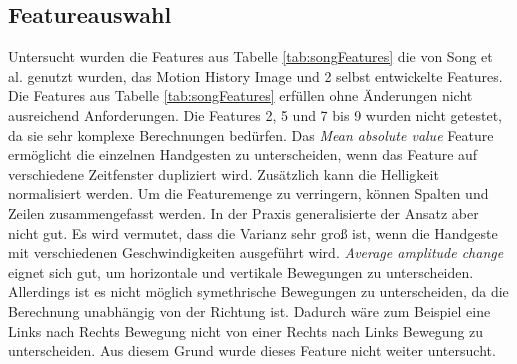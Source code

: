 \subsection{Featureauswahl}
\label{sec:feature_selection}
Untersucht wurden die Features aus Tabelle \ref{tab:songFeatures} die von Song et al. genutzt wurden, das Motion History Image und 2 selbst entwickelte Features. Die Features aus
Tabelle \ref{tab:songFeatures} erfüllen ohne Änderungen nicht ausreichend Anforderungen. Die Features 2, 5 und 7 bis 9 wurden nicht getestet, da sie sehr komplexe Berechnungen bedürfen.
\newline
\newline
Das \textit{Mean absolute value} Feature ermöglicht die einzelnen Handgesten zu unterscheiden, wenn das Feature auf verschiedene Zeitfenster dupliziert wird. Zusätzlich kann die Helligkeit normalisiert werden.
Um die Featuremenge zu verringern, können Spalten und Zeilen zusammengefasst werden. In der Praxis generalisierte der Ansatz aber nicht gut. Es wird vermutet, dass die Varianz sehr groß ist, wenn die
Handgeste mit verschiedenen Geschwindigkeiten ausgeführt wird.
\newline
\newline
\textit{Average amplitude change} eignet sich gut, um horizontale und vertikale Bewegungen zu unterscheiden. Allerdings ist es nicht möglich symethrische Bewegungen zu unterscheiden, da die Berechnung
unabhängig von der Richtung ist. Dadurch wäre zum Beispiel eine Links nach Rechts Bewegung nicht von einer Rechts nach Links Bewegung zu unterscheiden. Aus diesem Grund wurde dieses Feature nicht
weiter untersucht.

